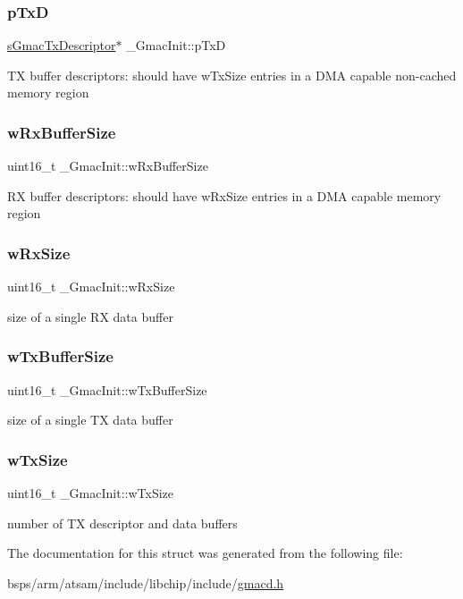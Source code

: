 \subsubsection{\texorpdfstring{pTxD}{pTxD}}
{\footnotesize\ttfamily \mbox{\hyperlink{group__gmac__structs_ga69a2b24578edebf2e816c4d3ca20edeb}{s\+Gmac\+Tx\+Descriptor}}$\ast$ \+\_\+\+Gmac\+Init\+::p\+TxD}

TX buffer descriptors\+: should have w\+Tx\+Size entries in a D\+MA capable non-\/cached memory region \mbox{\label{struct__GmacInit_a5117bae03b880af82ba8dd7bf4a334d3}} 
\subsubsection{\texorpdfstring{wRxBufferSize}{wRxBufferSize}}
{\footnotesize\ttfamily uint16\+\_\+t \+\_\+\+Gmac\+Init\+::w\+Rx\+Buffer\+Size}

RX buffer descriptors\+: should have w\+Rx\+Size entries in a D\+MA capable memory region \mbox{\label{struct__GmacInit_ae71c30d3bb9175cfa72b1fc8e49747b2}} 
\subsubsection{\texorpdfstring{wRxSize}{wRxSize}}
{\footnotesize\ttfamily uint16\+\_\+t \+\_\+\+Gmac\+Init\+::w\+Rx\+Size}

size of a single RX data buffer \mbox{\label{struct__GmacInit_a1572f258d874dd7dda4a6a6212608c4f}} 
\subsubsection{\texorpdfstring{wTxBufferSize}{wTxBufferSize}}
{\footnotesize\ttfamily uint16\+\_\+t \+\_\+\+Gmac\+Init\+::w\+Tx\+Buffer\+Size}

size of a single TX data buffer \mbox{\label{struct__GmacInit_a9f9b1f11aeae75fd0e37641e0309524b}} 
\subsubsection{\texorpdfstring{wTxSize}{wTxSize}}
{\footnotesize\ttfamily uint16\+\_\+t \+\_\+\+Gmac\+Init\+::w\+Tx\+Size}

number of TX descriptor and data buffers 

The documentation for this struct was generated from the following file\+:\begin{DoxyCompactItemize}
\item 
bsps/arm/atsam/include/libchip/include/\mbox{\hyperlink{gmacd_8h}{gmacd.\+h}}\end{DoxyCompactItemize}
